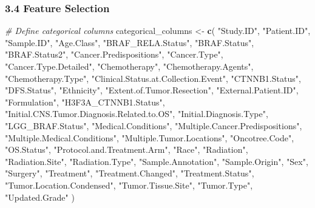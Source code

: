 \documentclass[
]{article}
\newenvironment{Shaded}{\begin{snugshade}}{\end{snugshade}}
\newcommand{\CommentTok}[1]{\textcolor[rgb]{0.56,0.35,0.01}{\textit{#1}}}
\newcommand{\FunctionTok}[1]{\textcolor[rgb]{0.13,0.29,0.53}{\textbf{#1}}}
\newcommand{\NormalTok}[1]{#1}
\newcommand{\OtherTok}[1]{\textcolor[rgb]{0.56,0.35,0.01}{#1}}
\newcommand{\StringTok}[1]{\textcolor[rgb]{0.31,0.60,0.02}{#1}}
\begin{document}
\subsubsection{\texorpdfstring{\textbf{3.4 Feature
Selection}}{3.4 Feature Selection}}\label{feature-selection}

\begin{Shaded}
\begin{Highlighting}[]
   \CommentTok{\# Define categorical columns}
\NormalTok{categorical\_columns }\OtherTok{\textless{}{-}} \FunctionTok{c}\NormalTok{(}
  \StringTok{"Study.ID"}\NormalTok{, }\StringTok{"Patient.ID"}\NormalTok{, }\StringTok{"Sample.ID"}\NormalTok{, }\StringTok{"Age.Class"}\NormalTok{, }\StringTok{"BRAF\_RELA.Status"}\NormalTok{, }
  \StringTok{"BRAF.Status"}\NormalTok{, }\StringTok{"BRAF.Status2"}\NormalTok{, }\StringTok{"Cancer.Predispositions"}\NormalTok{, }\StringTok{"Cancer.Type"}\NormalTok{, }
  \StringTok{"Cancer.Type.Detailed"}\NormalTok{, }\StringTok{"Chemotherapy"}\NormalTok{, }\StringTok{"Chemotherapy.Agents"}\NormalTok{, }
  \StringTok{"Chemotherapy.Type"}\NormalTok{, }\StringTok{"Clinical.Status.at.Collection.Event"}\NormalTok{, }
  \StringTok{"CTNNB1.Status"}\NormalTok{, }\StringTok{"DFS.Status"}\NormalTok{, }\StringTok{"Ethnicity"}\NormalTok{, }\StringTok{"Extent.of.Tumor.Resection"}\NormalTok{, }
  \StringTok{"External.Patient.ID"}\NormalTok{, }\StringTok{"Formulation"}\NormalTok{, }\StringTok{"H3F3A\_CTNNB1.Status"}\NormalTok{, }
  \StringTok{"Initial.CNS.Tumor.Diagnosis.Related.to.OS"}\NormalTok{, }\StringTok{"Initial.Diagnosis.Type"}\NormalTok{, }
  \StringTok{"LGG\_BRAF.Status"}\NormalTok{, }\StringTok{"Medical.Conditions"}\NormalTok{, }\StringTok{"Multiple.Cancer.Predispositions"}\NormalTok{, }
  \StringTok{"Multiple.Medical.Conditions"}\NormalTok{, }\StringTok{"Multiple.Tumor.Locations"}\NormalTok{, }\StringTok{"Oncotree.Code"}\NormalTok{, }
  \StringTok{"OS.Status"}\NormalTok{, }\StringTok{"Protocol.and.Treatment.Arm"}\NormalTok{, }\StringTok{"Race"}\NormalTok{, }\StringTok{"Radiation"}\NormalTok{, }
  \StringTok{"Radiation.Site"}\NormalTok{, }\StringTok{"Radiation.Type"}\NormalTok{, }\StringTok{"Sample.Annotation"}\NormalTok{, }\StringTok{"Sample.Origin"}\NormalTok{, }
  \StringTok{"Sex"}\NormalTok{, }\StringTok{"Surgery"}\NormalTok{, }\StringTok{"Treatment"}\NormalTok{, }\StringTok{"Treatment.Changed"}\NormalTok{, }\StringTok{"Treatment.Status"}\NormalTok{, }
  \StringTok{"Tumor.Location.Condensed"}\NormalTok{, }\StringTok{"Tumor.Tissue.Site"}\NormalTok{, }\StringTok{"Tumor.Type"}\NormalTok{, }\StringTok{"Updated.Grade"}
\NormalTok{)}
\end{Highlighting}
\end{Shaded}
\end{document}
